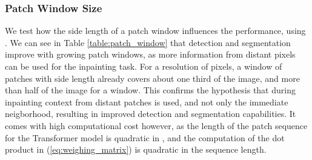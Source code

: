 \documentclass[final,5p,times,twocolumn]{elsarticle}
\begin{document}
	\begin{table}[h]
		\begin{center}
			\label{table:local_global}
		\end{center}
	\end{table}
	
	\subsubsection{Patch Window Size}
	\label{ablation:patch_window_size}
	
	We test how the side length  of a patch window influences the performance, using . We can see in Table \ref{table:patch_window} that detection and segmentation improve with growing patch windows, as more information from distant pixels can be used for the inpainting task. For a resolution of  pixels, a  window of patches with side length  already covers about one third of the image, and more than half of the image for a  window. This confirms the hypothesis that during inpainting context from distant patches is used, and not only the immediate neigborhood, resulting in improved detection and segmentation capabilities. It comes with high computational cost however, as the length of the patch sequence for the Transformer model is quadratic in , and the computation of the dot product in (\ref{eq:weighing_matrix}) is quadratic in the sequence length.
	
	\begin{table}[h]
		\begin{center}
			\label{table:patch_window}
		\end{center}
	\end{table}
	
\end{document}
